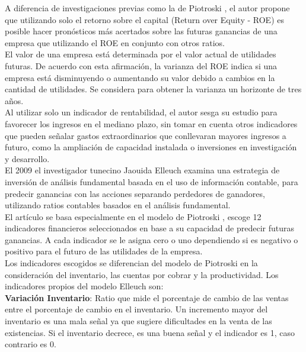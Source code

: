 A diferencia de investigaciones previas como la de Piotroski \cite{Piotroski2000}, el autor propone que utilizando solo el retorno sobre el capital (Return over Equity - ROE) es posible hacer pronósticos más acertados sobre las futuras ganancias de una empresa que utilizando el ROE en conjunto con otros ratios.\\

El valor de una empresa está determinada por el valor actual de utilidades futuras. De acuerdo con esta afirmación, la varianza del ROE indica si una empresa está disminuyendo o aumentando su valor debido a cambios en la cantidad de utilidades. Se considera para obtener la varianza un horizonte de tres años.\\

Al utilizar solo un indicador de rentabilidad, el autor sesga su estudio para favorecer los ingresos en el mediano plazo, sin tomar en cuenta otros indicadores que pueden señalar gastos extraordinarios que conllevaran mayores ingresos a futuro, como la ampliación de capacidad instalada o inversiones en investigación y desarrollo.\\



El 2009 el investigador tunecino Jaouida Elleuch \cite{Elleuch2009} examina una estrategia de inversión de análisis fundamental basada en el uso de información contable, para predecir ganancias con las acciones separando perdedores de ganadores, utilizando ratios contables basados en el análisis fundamental.\\

El art\'iculo se basa especialmente en el modelo de Piotroski \cite{Piotroski2000}, escoge 12 indicadores financieros seleccionados en base a su capacidad de predecir futuras ganancias. A cada indicador se le asigna cero o uno dependiendo si es negativo o positivo para el futuro de las utilidades de la empresa.\\

Los indicadores escogidos se diferencian del modelo de Piotroski \cite{Piotroski2000} en la consideraci\'on del inventario, las cuentas por cobrar y la productividad. Los indicadores propios del modelo Elleuch son:\\

\textbf{Variación Inventario}: Ratio que mide el porcentaje de cambio de las ventas entre el porcentaje de cambio en el inventario. Un incremento mayor del inventario es una mala señal ya que sugiere dificultades en la venta de las existencias. Si el inventario decrece, es una buena señal y el indicador es 1, caso contrario es 0.\\

